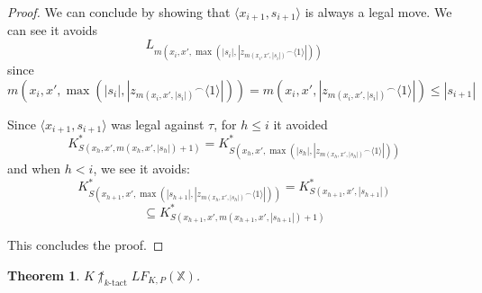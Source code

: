 \documentclass[11pt]{article}
\theoremstyle{plain}
\newtheorem{theorem}{Theorem}
\theoremstyle{definition}
\theoremstyle{remark}
\newcommand{\ktactwin}[1]{\uparrow_{#1\text{-tact}}}
\newcommand{\lfkpgame}[1]{LF_{K,P}(#1)}
\newcommand{\<}{\langle}
\renewcommand{\>}{\rangle}
\begin{document}
\begin{proof}
We can conclude by showing that $\<x_{i+1},s_{i+1}\>$ is always a legal move. We can see it avoids 
  \[
  L_{m(x_{i},x',\max(|s_{i}|,|{z_{m(x_i,x',|s_i|)}}^\frown\<1\>|))}
  \]
since
  \[
    m(x_{i},x',\max(|s_{i}|,|{z_{m(x_i,x',|s_i|)}}^\frown\<1\>|)) =
    m(x_{i},x',|{z_{m(x_i,x',|s_i|)}}^\frown\<1\>|) \leq
    |s_{i+1}|
  \]

Since $\<x_{i+1},s_{i+1}\>$ was legal against $\tau$, for $h\leq i$ it avoided
  \[
    K^*_{S(x_h,x',m(x_h,x',|s_h|)+1)} = 
    K^*_{S(x_h,x',\max(|s_h|,|{z_{m(x_h,x',|s_h|)}}^\frown\<1\>|))}
  \]
and when $h<i$, we see it avoids:
  \[
    K^*_{S(x_{h+1},x',\max(|s_{h+1}|,|{z_{m(x_h,x',|s_h|)}}^\frown\<1\>|))} =
    K^*_{S(x_{h+1},x',|s_{h+1}|)}
  \]
  \[
    \subseteq
    K^*_{S(x_{h+1},x',m(x_{h+1},x',|s_{h+1}|)+1)}
  \]

This concludes the proof.
\end{proof}

\newpage

\begin{theorem}
$K\not\ktactwin{k}\lfkpgame{\mathbb{X}}$.
\end{theorem}
\end{document}
